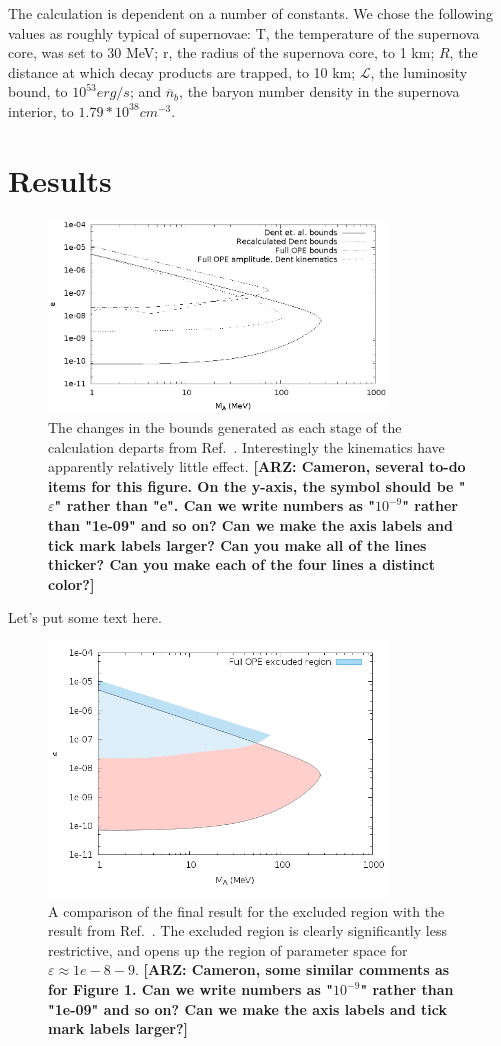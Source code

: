 \documentclass[nofootinbib,prd,superscriptaddress,twocolumn]{revtex4}
\newcommand{\n}{\overline{n}}
\newcommand{\arz}[1]{{{\bf{\color{BrickRed}[ARZ: #1]}}}}
\begin{document}
The calculation is dependent on a number of constants. We chose the following values as roughly typical of supernovae: T, the temperature of the supernova core, was set to 30 MeV; r, the radius of the supernova core, to 1 km; $ R $, the distance at which decay products are trapped, to 10 km; $ \mathcal{L} $, the luminosity bound, to $ 10^{53} erg/s $; and $ \n_b $, the baryon number density in the supernova interior, to $ 1.79*10^{38} cm^{-3} $. 


\section{Results}
\label{section:results}

\begin{figure}[th]
\includegraphics[width=9cm]{stages.eps}
\caption{The changes in the bounds generated as each stage of the calculation departs from Ref.~\cite{dent_etal12}. Interestingly the kinematics have apparently relatively little effect.
\arz{Cameron, several to-do items for this figure. On the y-axis, the symbol should be "$\varepsilon$" rather than 
"e". Can we write numbers as "$10^{-9}$" rather than "1e-09" and so on? Can we make the axis labels and 
tick mark labels larger? Can you make all of the lines thicker? Can you make each of the four lines a distinct color?}
}
\end{figure}

Let's put some text here.

\begin{figure}[th]
	\includegraphics[width=9cm]{endtoend.png}
	\caption{A comparison of the final result for the excluded region with the result from Ref.~\cite{dent_etal12}. The excluded region is clearly significantly less restrictive, and opens up the region of parameter space for $\varepsilon \approx  1e-8-9 $.
\arz{Cameron, some similar comments as for Figure 1. Can we write numbers as "$10^{-9}$" rather 
than "1e-09" and so on? Can we make the axis labels and tick mark labels larger?}	
	}
\end{figure}
\end{document}
